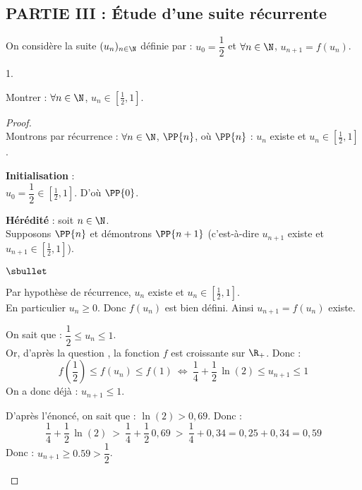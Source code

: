 \subsection*{PARTIE III : Étude d'une suite récurrente}

\noindent
On considère la suite $(u_n)_{n\in \N}$ définie par : $u_0 =
\dfrac{1}{2}$ \quad et \quad $\forall n\in \N$, $u_{n+1} = f(u_n)$.

\begin{noliste}{1.}
\setlength{\itemsep}{2mm}
\setcounter{enumi}{8}
\item Montrer : $\forall n\in \N$, $u_n \in \left[\frac{1}{2},
    1\right]$.

  \begin{proof}~\\
    Montrons par récurrence : $\forall n\in\N$, $\PP{n}$, \quad où
    \quad $\PP{n}$ : $u_n$ existe et $u_n\in
    \left[\frac{1}{2},1\right]$.
    \begin{noliste}{\fitem}
    \item {\bf Initialisation} : \\
      $u_0=\dfrac{1}{2} \in \left[\frac{1}{2}, 1\right]$. D'où
      $\PP{0}$.
      
    \item {\bf Hérédité} : soit $n\in\N$.\\
      Supposons $\PP{n}$ et démontrons $\PP{n+1}$ (c'est-à-dire
      $u_{n+1}$ existe et $u_{n+1}\in \left[\frac{1}{2},1\right]$).
 \begin{noliste}{$\sbullet$}
 \item Par hypothèse de récurrence, $u_n$ existe et $u_n\in \left[
 \frac{1}{2},1\right]$.\\
 En particulier $u_n\geq 0$. Donc $f(u_n)$ est bien défini. 
 Ainsi $u_{n+1}=f(u_n)$ existe.
 
 \item On sait que : $\dfrac{1}{2} \leq u_n \leq 1$.\\
 Or, d'après la question , la fonction $f$ est croissante
 sur $\R_+$. 
 Donc :
 \[
  f\left(\dfrac{1}{2}\right) \leq f(u_n) \leq f(1) \ 
  \Leftrightarrow \ 
  \dfrac{1}{4} + \dfrac{1}{2}\, \ln(2) \leq u_{n+1} \leq 1
 \]
 On a donc déjà : $u_{n+1} \leq 1$.
 
 \item D'après l'énoncé, on sait que : $\ln(2)>0,69$. Donc :
 \[
  \dfrac{1}{4} + \dfrac{1}{2} \, \ln(2) \ > \ \dfrac{1}{4} + 
  \dfrac{1}{2} \, 0,69 \ > \ \dfrac{1}{4} + 0,34 = 0,25+0,34 = 0,59
 \]
 Donc : $u_{n+1} \geq 0.59 > \dfrac{1}{2}$.
 \end{noliste}
 

\end{noliste}
\end{proof}
\end{noliste}
